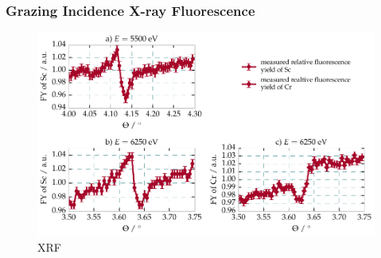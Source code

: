 \subsubsection{Grazing Incidence X-ray Fluorescence}
\begin{figure}[htbp]
  \centering
  \includegraphics[width=\textwidth]{img/CrSc_fluorescence_data}
  \caption{XRF}
  \label{ch_spec:fig_CrSc_fluorescence_data}
\end{figure}

